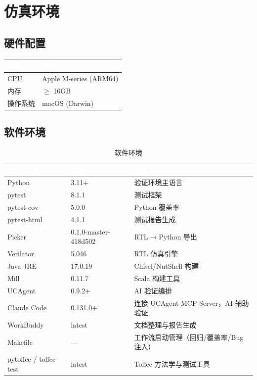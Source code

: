\documentclass[12pt,a4paper]{ctexart}
\newcommand{\thcell}[1]{\textcolor{white}{\bfseries #1}}
\begin{document}
\newpage

\section{仿真环境}

\subsection{硬件配置}

\begin{table}[H]
\centering
\renewcommand{\arraystretch}{1.3}
\begin{tabular}{@{}p{3cm}p{8cm}@{}}
\toprule
\rowcolor{primaryblue}
\thcell{项目} & \thcell{规格} \\
\midrule
\rowcolor{rowgray} CPU & Apple M-series (ARM64) \\
内存 & $\ge$ 16GB \\
\rowcolor{rowgray} 操作系统 & macOS (Darwin) \\
\bottomrule
\end{tabular}
\end{table}

\subsection{软件环境}

\begin{table}[H]
\centering
\caption{软件环境}
\renewcommand{\arraystretch}{1.3}
\begin{tabular}{@{}p{3.5cm}p{3.5cm}p{5cm}@{}}
\toprule
\rowcolor{primaryblue}
\thcell{软件/工具} & \thcell{版本} & \thcell{说明} \\
\midrule
\rowcolor{rowgray} Python & 3.11+ & 验证环境主语言 \\
pytest & 8.1.1 & 测试框架 \\
\rowcolor{rowgray} pytest-cov & 5.0.0 & Python 覆盖率 \\
pytest-html & 4.1.1 & 测试报告生成 \\
\rowcolor{rowgray} Picker & 0.1.0-master-418d502 & RTL$\rightarrow$Python 导出 \\
Verilator & 5.046 & RTL 仿真引擎 \\
\rowcolor{rowgray} Java JRE & 17.0.19 & Chisel/NutShell 构建 \\
Mill & 0.11.7 & Scala 构建工具 \\
\rowcolor{rowgray} UCAgent & 0.9.2+ & AI 验证编排 \\
Claude Code & 0.131.0+ & 连接 UCAgent MCP Server，AI 辅助验证 \\
\rowcolor{rowgray} WorkBuddy & latest & 文档整理与报告生成 \\
Makefile & --- & 工作流启动管理（回归/覆盖率/Bug 注入） \\
\rowcolor{rowgray} pytoffee / toffee-test & latest & Toffee 方法学与测试工具 \\
\bottomrule
\end{tabular}
\end{table}
\end{document}
